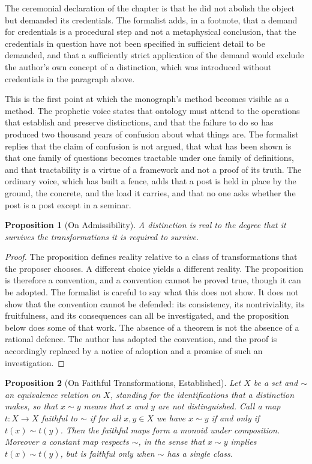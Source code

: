 \documentclass[11pt,openany,twoside]{book}
\theoremstyle{plain}
\newtheorem{proposition}{Proposition}[chapter]
\theoremstyle{definition}
\theoremstyle{remark}
\begin{document}
The ceremonial declaration of the chapter is that he did not abolish the object but demanded its credentials. The formalist adds, in a footnote, that a demand for credentials is a procedural step and not a metaphysical conclusion, that the credentials in question have not been specified in sufficient detail to be demanded, and that a sufficiently strict application of the demand would exclude the author's own concept of a distinction, which was introduced without credentials in the paragraph above.

This is the first point at which the monograph's method becomes visible as a method. The prophetic voice states that ontology must attend to the operations that establish and preserve distinctions, and that the failure to do so has produced two thousand years of confusion about what things are. The formalist replies that the claim of confusion is not argued, that what has been shown is that one family of questions becomes tractable under one family of definitions, and that tractability is a virtue of a framework and not a proof of its truth. The ordinary voice, which has built a fence, adds that a post is held in place by the ground, the concrete, and the load it carries, and that no one asks whether the post is a post except in a seminar.

\begin{proposition}[On Admissibility]\label{prop:adm}
A distinction is real to the degree that it survives the transformations it is required to survive.
\end{proposition}

\begin{proof}
The proposition defines reality relative to a class of transformations that the proposer chooses. A different choice yields a different reality. The proposition is therefore a convention, and a convention cannot be proved true, though it can be adopted. The formalist is careful to say what this does not show. It does not show that the convention cannot be defended: its consistency, its nontriviality, its fruitfulness, and its consequences can all be investigated, and the proposition below does some of that work. The absence of a theorem is not the absence of a rational defence. The author has adopted the convention, and the proof is accordingly replaced by a notice of adoption and a promise of such an investigation.
\end{proof}

\begin{proposition}[On Faithful Transformations, Established]\label{prop:faithful}
Let $X$ be a set and $\sim$ an equivalence relation on $X$, standing for the identifications that a distinction makes, so that $x\sim y$ means that $x$ and $y$ are not distinguished. Call a map $t\colon X\to X$ \emph{faithful} to $\sim$ if for all $x,y\in X$ we have $x\sim y$ if and only if $t(x)\sim t(y)$. Then the faithful maps form a monoid under composition. Moreover a constant map respects $\sim$, in the sense that $x\sim y$ implies $t(x)\sim t(y)$, but is faithful only when $\sim$ has a single class.
\end{proposition}
\end{document}
